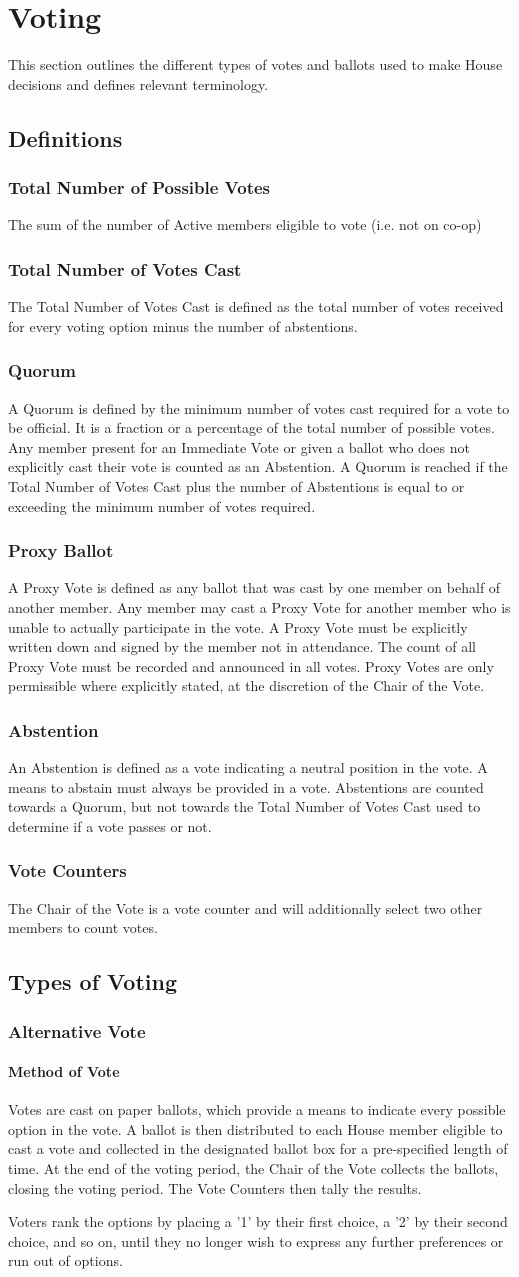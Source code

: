 \documentclass{article}
\newcommand{\article}[1]{\section{#1} \label{#1}}
\newcommand{\asection}[1]{\subsection{#1} \label{#1}}
\newcommand{\asubsection}[1]{\subsubsection{#1} \label{#1}}
\newcommand{\asubsubsection}[1]{\paragraph{#1} \label{#1}}
\begin{document}
\article{Voting}
This section outlines the different types of votes and ballots used to make House decisions and defines relevant terminology.
\asection{Definitions}
\asubsection{Total Number of Possible Votes}
The sum of the number of Active members eligible to vote (i.e. not on co-op)
\asubsection{Total Number of Votes Cast}
The Total Number of Votes Cast is defined as the total number of votes received for every voting option minus the number of abstentions.
\asubsection{Quorum}
A Quorum is defined by the minimum number of votes cast required for a vote to be official.
It is a fraction or a percentage of the total number of possible votes.
Any member present for an Immediate Vote or given a ballot who does not explicitly cast their vote is counted as an Abstention.
A Quorum is reached if the Total Number of Votes Cast plus the number of Abstentions is equal to or exceeding the minimum number of votes required.
\asubsection{Proxy Ballot}
A Proxy Vote is defined as any ballot that was cast by one member on behalf of another member.
Any member may cast a Proxy Vote for another member who is unable to actually participate in the vote.
A Proxy Vote must be explicitly written down and signed by the member not in attendance.
The count of all Proxy Vote must be recorded and announced in all votes.
Proxy Votes are only permissible where explicitly stated, at the discretion of the Chair of the Vote.
\asubsection{Abstention}
An Abstention is defined as a vote indicating a neutral position in the vote.
A means to abstain must always be provided in a vote.
Abstentions are counted towards a Quorum, but not towards the Total Number of Votes Cast used to determine if a vote passes or not.
\asubsection{Vote Counters}
The Chair of the Vote is a vote counter and will additionally select two other members to count votes.

\asection{Types of Voting}
\asubsection{Alternative Vote}
\asubsubsection{Method of Vote}
Votes are cast on paper ballots, which provide a means to indicate every possible option in the vote.
A ballot is then distributed to each House member eligible to cast a vote and collected in the designated ballot box for a pre-specified length of time.
At the end of the voting period, the Chair of the Vote collects the ballots, closing the voting period.
The Vote Counters then tally the results.

Voters rank the options by placing a '1' by their first choice, a '2' by their second choice, and so on, until they no longer wish to express any further preferences or run out of options.
\end{document}
